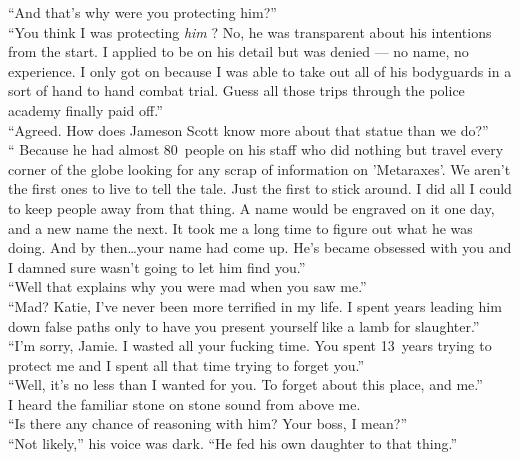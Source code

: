 \documentclass[a5paper]{scrartcl}
\begin{document}
\enquote{And that's why were you protecting him?}\\


\enquote{You think I was protecting \textit{him}
? No, he was transparent about his intentions from the start. I applied to be on his detail but was denied --- no name, no experience. I only got on because I was able to take out all of his bodyguards in a sort of hand to hand combat trial. Guess all those trips through the police academy finally paid off.}\\


\enquote{Agreed. How does Jameson Scott know more about that statue than we do?}\\


\enquote{ Because he had almost 80~people on his staff who did nothing but travel every corner of the globe looking for any scrap of information on 'Metaraxes'.  We aren't the first ones to live to tell the tale. Just the first to stick around.  I did all I could to keep people away from that thing. A name would be engraved on it one day, and a new name the next. It took me a long time to figure out what he was doing. And by then\dots your name had come up. He's became obsessed with you and I damned sure wasn't going to let him find you.}\\


\enquote{Well that explains why you were mad when you saw me.}\\


\enquote{Mad? Katie, I've never been more terrified in my life. I spent years leading him down false paths only to have you present yourself like a lamb for slaughter.}\\


\enquote{I'm sorry, Jamie. I wasted all your fucking time.  You spent 13~years trying to protect me and I spent all that time trying to forget you.} \\


\enquote{Well, it's no less than I wanted for you. To forget about this place, and me.}\\


I heard the familiar stone on stone sound from above me. \\


\enquote{Is there any chance of reasoning with him? Your boss, I mean?}\\


\enquote{Not likely,} his voice was dark. \enquote{He fed his own daughter to that thing.}\\
\end{document}
